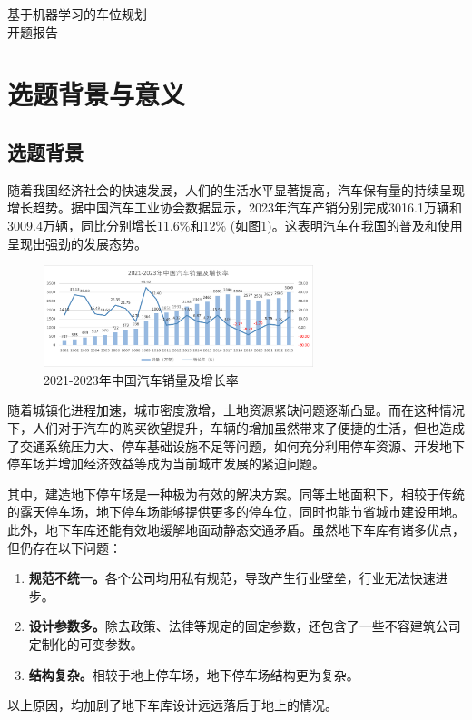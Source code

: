 \setcounter{page}{1}
\begin{center}
    \heiti {}基于机器学习的车位规划\\
    开题报告
\end{center}
\songti {}
\section{选题背景与意义}
\subsection{选题背景}
随着我国经济社会的快速发展，人们的生活水平显著提高，汽车保有量的持续呈现增长趋势。据中国汽车工业协会数据显示，2023年汽车产销分别完成3016.1万辆和3009.4万辆，同比分别增长11.6\%和12\% (如图\ref{fig:cars_sales})。这表明汽车在我国的普及和使用呈现出强劲的发展态势。
\begin{figure}[H]
  \centering
  \includegraphics[width=0.7\textwidth]{pictures/2021-2023年中国汽车销量及增长率.png}
  \caption{2021-2023年中国汽车销量及增长率}
  \label{fig:cars_sales}
\end{figure}
随着城镇化进程加速\cite{XXCZ202306017}，城市密度激增\cite{JZXB201004006}，土地资源紧缺问题逐渐凸显。而在这种情况下，人们对于汽车的购买欲望提升，车辆的增加虽然带来了便捷的生活，但也造成了交通系统压力大、停车基础设施不足等问题\cite{CSDQ200708009}，如何充分利用停车资源、开发地下停车场\cite{JSSD201905002}并增加经济效益等成为当前城市发展的紧迫问题。

其中，建造地下停车场是一种极为有效的解决方案。同等土地面积下，相较于传统的露天停车场，地下停车场能够提供更多的停车位\cite{1022811825.nh}，同时也能节省城市建设用地。此外，地下车库还能有效地缓解地面动静态交通矛盾\cite{CSDQ201807120}。虽然地下车库有诸多优点，但仍存在以下问题：
\begin{enumerate}
    \item {\bfseries 规范不统一。}各个公司均用私有规范，导致产生行业壁垒，行业无法快速进步。
    \item {\bfseries 设计参数多。}除去政策、法律等规定的固定参数\cite{ZGBZ202119043}，还包含了一些不容建筑公司定制化的可变参数。
    \item {\bfseries 结构复杂。}相较于地上停车场，地下停车场结构更为复杂。
\end{enumerate}
以上原因，均加剧了地下车库设计远远落后于地上的情况。

